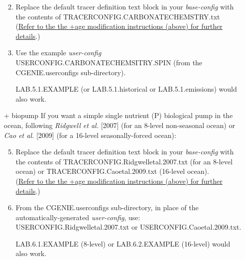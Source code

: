 \begin{itemize}[noitemsep]
\begin{enumerate}
\vspace{1mm}
\item Replace the default tracer definition text block in your \textit{base-config} with the contents of \textsf{\footnotesize TRACERCONFIG.CARBONATECHEMSTRY.txt} \\(\uline{Refer to the the +age modification instructions (above) for further details}.)

\vspace{1mm}
\item Use the example \textit{user-config} \textsf{\footnotesize USERCONFIG.CARBONATECHEMSITRY.SPIN} (from the \textsf{\footnotesize CGENIE.userconfigs} sub-directory).

\textsf{\footnotesize LAB.5.1.EXAMPLE} (or \textsf{\footnotesize LAB.5.1.historical} or \textsf{\footnotesize LAB.5.1.emissions}) would also work.

\end{enumerate}

\newpage

\vspace{2mm}
\item [+ biopump] If you want a simple single nutrient (P) biological pump in the ocean, following \textit{Ridgwell et al.} [2007] (for an 8-level non-seasonal ocean) or \textit{Cao et al.} [2009] (for a 16-level seasonally-forced ocean):

\begin{enumerate}
\setcounter{enumi}{4}

\vspace{1mm}
\item Replace the default tracer definition text block in your \textit{base-config} with the contents of \textsf{\footnotesize TRACERCONFIG.Ridgwelletal.2007.txt} (for an 8-level ocean) or \textsf{\footnotesize TRACERCONFIG.Caoetal.2009.txt} (16-level ocean). \\(\uline{Refer to the the +age modification instructions (above) for further details}.)

\vspace{1mm}
\item From the \textsf{\footnotesize CGENIE.userconfigs} sub-directory, in place of the automatically-generated \textit{user-config}, use: \textsf{\footnotesize USERCONFIG.Ridgwelletal.2007.txt} or \textsf{\footnotesize USERCONFIG.Caoetal.2009.txt}.

\textsf{\footnotesize LAB.6.1.EXAMPLE} (8-level) or \textsf{\footnotesize LAB.6.2.EXAMPLE} (16-level) would also work.

\end{enumerate}

\end{itemize}

